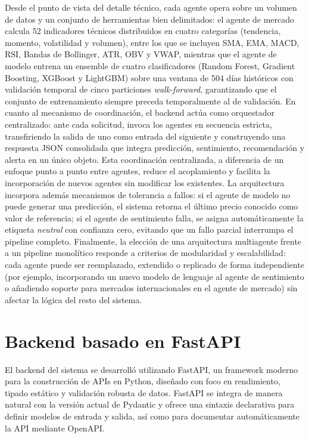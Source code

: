 Desde el punto de vista del detalle técnico, cada agente opera sobre un volumen de datos y un conjunto de herramientas bien delimitados: el agente de mercado calcula 52 indicadores técnicos distribuidos en cuatro categorías (tendencia, momento, volatilidad y volumen), entre los que se incluyen SMA, EMA, MACD, RSI, Bandas de Bollinger, ATR, OBV y VWAP, mientras que el agente de modelo entrena un ensemble de cuatro clasificadores (Random Forest, Gradient Boosting, XGBoost y LightGBM) sobre una ventana de 504 días históricos con validación temporal de cinco particiones \textit{walk-forward}, garantizando que el conjunto de entrenamiento siempre preceda temporalmente al de validación. En cuanto al mecanismo de coordinación, el backend actúa como orquestador centralizado: ante cada solicitud, invoca los agentes en secuencia estricta, transfiriendo la salida de uno como entrada del siguiente y construyendo una respuesta JSON consolidada que integra predicción, sentimiento, recomendación y alerta en un único objeto. Esta coordinación centralizada, a diferencia de un enfoque punto a punto entre agentes, reduce el acoplamiento y facilita la incorporación de nuevos agentes sin modificar los existentes. La arquitectura incorpora además mecanismos de tolerancia a fallos: si el agente de modelo no puede generar una predicción, el sistema retorna el último precio conocido como valor de referencia; si el agente de sentimiento falla, se asigna automáticamente la etiqueta \textit{neutral} con confianza cero, evitando que un fallo parcial interrumpa el pipeline completo. Finalmente, la elección de una arquitectura multiagente frente a un pipeline monolítico responde a criterios de modularidad y escalabilidad: cada agente puede ser reemplazado, extendido o replicado de forma independiente (por ejemplo, incorporando un nuevo modelo de lenguaje al agente de sentimiento o añadiendo soporte para mercados internacionales en el agente de mercado) sin afectar la lógica del resto del sistema.

\section{Backend basado en FastAPI}

El backend del sistema se desarrolló utilizando FastAPI, un framework moderno para la construcción de APIs en Python, diseñado con foco en rendimiento, tipado estático y validación robusta de datos. FastAPI se integra de manera natural con la versión actual de Pydantic y ofrece una sintaxis declarativa para definir modelos de entrada y salida, así como para documentar automáticamente la API mediante OpenAPI.

